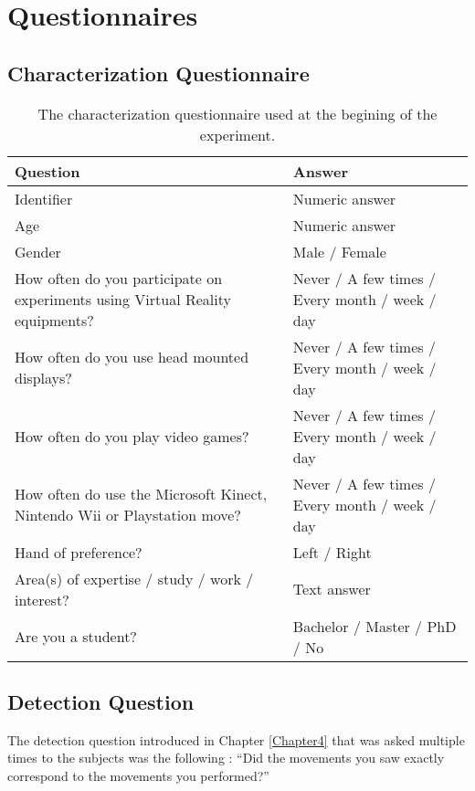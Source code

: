 
\chapter{Questionnaires} %

\label{AppendixA} %

\section{Characterization Questionnaire}

\begin{table}[h]
  \centering
  \caption{The characterization questionnaire used at the begining of the experiment.}
  \begin{tabular}{| p{} | m{} |}
    \hline
    \textbf{Question}                                 & \textbf{Answer} \\ \hline
    Identifier                                        & Numeric answer \\ \hline
    Age                                               & Numeric answer \\ \hline
    Gender                                            & Male / Female \\ \hline
    How often do you participate on experiments
    using Virtual Reality equipments?                 & Never / A few times / Every month / week / day \\ \hline
    How often do you use head mounted displays?       & Never / A few times / Every month / week / day \\ \hline
    How often do you play video games?                & Never / A few times / Every month / week / day \\ \hline
    How often do use the Microsoft Kinect, Nintendo
    Wii or Playstation move?                          & Never / A few times / Every month / week / day \\ \hline
    Hand of preference?                               & Left / Right \\ \hline
    Area(s) of expertise / study / work / interest?   & Text answer \\ \hline
    Are you a student?                                & Bachelor / Master / PhD / No \\ \hline
  \end{tabular}
\end{table}

\section{Detection Question}

The detection question introduced in Chapter \ref{Chapter4} that was asked multiple times to the subjects was the following : ``Did the movements you saw exactly correspond to the movements you performed?''
